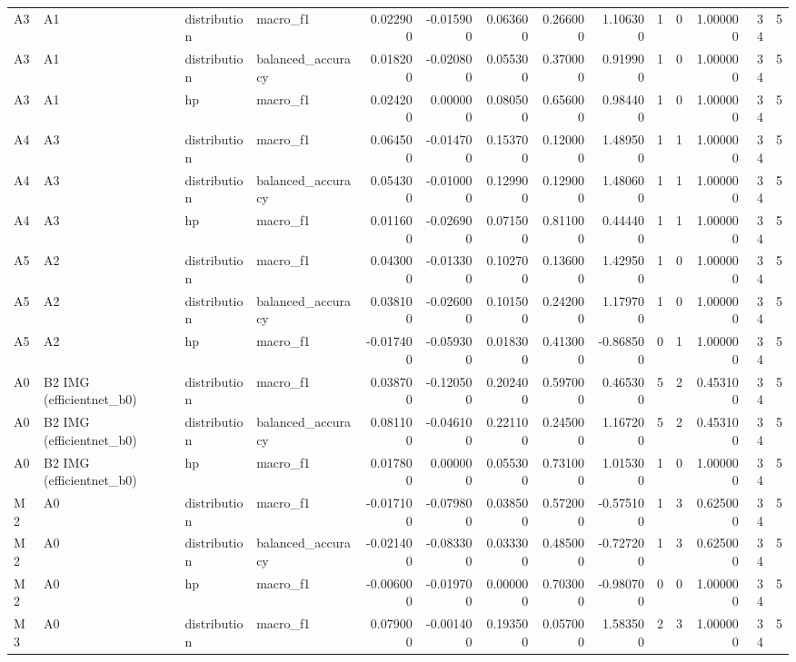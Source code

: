 \begin{table}
\begin{tabular}{llllrrrrrrrrrr}
A3 & A1 & distribution & macro\_f1 & 0.022900 & -0.015900 & 0.063600 & 0.266000 & 1.106300 & 1 & 0 & 1.000000 & 34 & 5 \\
A3 & A1 & distribution & balanced\_accuracy & 0.018200 & -0.020800 & 0.055300 & 0.370000 & 0.919900 & 1 & 0 & 1.000000 & 34 & 5 \\
A3 & A1 & hp & macro\_f1 & 0.024200 & 0.000000 & 0.080500 & 0.656000 & 0.984400 & 1 & 0 & 1.000000 & 34 & 5 \\
A4 & A3 & distribution & macro\_f1 & 0.064500 & -0.014700 & 0.153700 & 0.120000 & 1.489500 & 1 & 1 & 1.000000 & 34 & 5 \\
A4 & A3 & distribution & balanced\_accuracy & 0.054300 & -0.010000 & 0.129900 & 0.129000 & 1.480600 & 1 & 1 & 1.000000 & 34 & 5 \\
A4 & A3 & hp & macro\_f1 & 0.011600 & -0.026900 & 0.071500 & 0.811000 & 0.444400 & 1 & 1 & 1.000000 & 34 & 5 \\
A5 & A2 & distribution & macro\_f1 & 0.043000 & -0.013300 & 0.102700 & 0.136000 & 1.429500 & 1 & 0 & 1.000000 & 34 & 5 \\
A5 & A2 & distribution & balanced\_accuracy & 0.038100 & -0.026000 & 0.101500 & 0.242000 & 1.179700 & 1 & 0 & 1.000000 & 34 & 5 \\
A5 & A2 & hp & macro\_f1 & -0.017400 & -0.059300 & 0.018300 & 0.413000 & -0.868500 & 0 & 1 & 1.000000 & 34 & 5 \\
A0 & B2 IMG (efficientnet\_b0) & distribution & macro\_f1 & 0.038700 & -0.120500 & 0.202400 & 0.597000 & 0.465300 & 5 & 2 & 0.453100 & 34 & 5 \\
A0 & B2 IMG (efficientnet\_b0) & distribution & balanced\_accuracy & 0.081100 & -0.046100 & 0.221100 & 0.245000 & 1.167200 & 5 & 2 & 0.453100 & 34 & 5 \\
A0 & B2 IMG (efficientnet\_b0) & hp & macro\_f1 & 0.017800 & 0.000000 & 0.055300 & 0.731000 & 1.015300 & 1 & 0 & 1.000000 & 34 & 5 \\
M2 & A0 & distribution & macro\_f1 & -0.017100 & -0.079800 & 0.038500 & 0.572000 & -0.575100 & 1 & 3 & 0.625000 & 34 & 5 \\
M2 & A0 & distribution & balanced\_accuracy & -0.021400 & -0.083300 & 0.033300 & 0.485000 & -0.727200 & 1 & 3 & 0.625000 & 34 & 5 \\
M2 & A0 & hp & macro\_f1 & -0.006000 & -0.019700 & 0.000000 & 0.703000 & -0.980700 & 0 & 0 & 1.000000 & 34 & 5 \\
M3 & A0 & distribution & macro\_f1 & 0.079000 & -0.001400 & 0.193500 & 0.057000 & 1.583500 & 2 & 3 & 1.000000 & 34 & 5 \\

\end{tabular}
\end{table}
